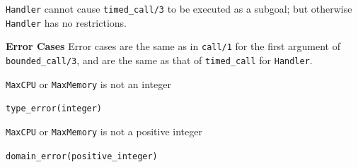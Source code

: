 \begin{description}
{\tt Handler} cannot cause {\tt timed\_call/3} to be executed as a
subgoal; but otherwise {\tt Handler} has no restrictions.


{\bf Error Cases} 
%
Error cases are the same as in {\tt call/1} for the first argument of
{\tt bounded\_call/3}, and are the same as that of {\tt timed\_call}
for {\tt Handler}.  
%
\begin{description}
\item {\tt MaxCPU} or {\tt MaxMemory} is not an integer
\bi
\item {\tt type\_error(integer)}
\ei
\item {\tt MaxCPU} or {\tt MaxMemory}  is not a positive integer
\bi
\item {\tt domain\_error(positive\_integer)}
\ei
\end{description}

\end{description}



